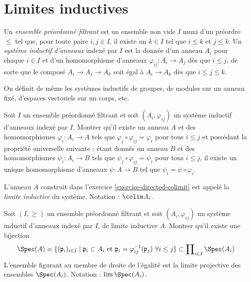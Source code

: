 \section{Limites inductives}
\label{section-colimits}


\begin{definition}
\label{definition-directed-poset}
Un {\it ensemble préordonné filtrant} est un ensemble non vide $I$ muni d'un préordre $\leq$
tel que, pour toute paire $i, j \in I$, il existe un $k \in I$ tel que
$i \leq k$ et $j \leq k$. Un {\it système inductif d'anneaux} indexé par $I$ est la donnée d'un
anneau $A_i$ pour chaque $i \in I$ et d'un homomorphisme d'anneaux $\varphi_{ij} : A_i \to A_j$
dès que $i \leq j$, de sorte que le composé $A_i \to A_j \to A_k$ soit égal à
$A_i \to A_k$ dès que $i \leq j \leq k$.
\end{definition}

\noindent
On définit de même les systèmes inductifs de groupes, de modules sur un anneau fixé,
d'espaces vectoriels sur un corps, etc.

\begin{exercise}
\label{exercise-directed-colimit}
Soit $I$ un ensemble préordonné filtrant et soit
$(A_i, \varphi_{ij})$ un système inductif d'anneaux indexé par $I$.
Montrer qu'il existe un anneau $A$ et des homomorphismes $\varphi_i : A_i \to A$
tels que $\varphi_j \circ \varphi_{ij} = \varphi_i$ pour tous $i \leq j$
et possédant la propriété universelle suivante : étant donnés un anneau $B$
et des homomorphismes $\psi_i : A_i \to B$ tels que
$\psi_j \circ \varphi_{ij} = \psi_i$ pour tous $i \leq j$, il
existe un unique homomorphisme d'anneaux $\psi : A \to B$ tel que
$\psi_i = \psi \circ \varphi_i$.
\end{exercise}

\begin{definition}
\label{definition-colimit}
L'anneau $A$ construit dans l'exercice \ref{exercise-directed-colimit}
est appelé la {\it limite inductive} du système. Notation : $\colim A_i$.
\end{definition}

\begin{exercise}
\label{exercise-prime-in-colimit}
Soit $(I, \geq)$ un ensemble préordonné filtrant et soit
$(A_i, \varphi_{ij})$ un système inductif d'anneaux indexé par $I$, de limite inductive
$A$. Montrer qu'il existe une bijection
$$
\Spec(A) = \{(\mathfrak p_i)_{i \in I} \mid
\mathfrak p_i \subset A_i \text{ et }
\mathfrak p_i = \varphi_{ij}^{-1}(\mathfrak p_j)\ \forall i \leq j\}
\subset \prod\nolimits_{i \in I} \Spec(A_i)
$$
L'ensemble figurant au membre de droite de l'égalité est la limite projective des ensembles
$\Spec(A_i)$. Notation : $\lim \Spec(A_i)$.
\end{exercise}

